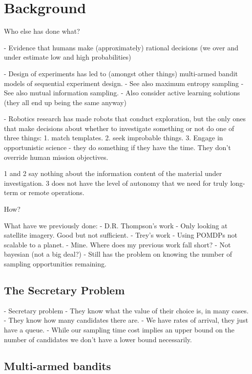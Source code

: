 \section{Background}
\label{sec:background}



	Who else has done what?

- Evidence that humans make (approximately) rational decisions (we over and under estimate low and high probabilities)

	- Design of experiments has led to (amongst other things) multi-armed bandit models of sequential experiment design.
	- See also maximum entropy sampling
	- See also mutual information sampling.
- Also consider active learning solutions (they all end up being the same anyway)

	- Robotics research has made robots that conduct exploration, but the only ones that make decisions about whether to investigate something or not do one of three things:
	1. match templates.
	2. seek improbable things.
	3. Engage in opportunistic science - they do something if they have the time.  They don't override human mission objectives.

	1 and 2 say nothing about the information content of the material under investigation.
	3 does not have the level of autonomy that we need for truly long-term or remote operations.

	How?

	What have we previously done:
	- D.R. Thompson's work
	- Only looking at satellite imagery.  Good but not sufficient.
	- Trey's work
	- Using POMDPs not scalable to a planet.
	- Mine. Where does my previous work fall short?
- Not bayesian (not a big deal?)
	- Still has the problem on knowing the number of sampling opportunities remaining.

\subsection{The Secretary Problem}

		- Secretary problem
			- They know what the value of their choice is, in many cases.
			- They know how many candidates there are.
			- We have rates of arrival, they just have a queue.
			- While our sampling time cost implies an upper bound on the number of 
			candidates we don't have a lower bound necessarily.

\subsection{Multi-armed bandits}

